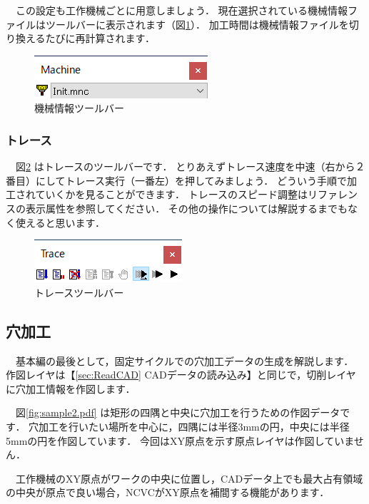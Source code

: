 \vspace*{2zh}
　この設定も工作機械ごとに用意しましょう．
現在選択されている機械情報ファイルはツールバーに表示されます（図\ref{fig:select.png}）．
加工時間は機械情報ファイルを切り換えるたびに再計算されます．

\begin{figure}[H]
\centering
\includegraphics{No2/fig/select.png}
\caption{機械情報ツールバー}
\label{fig:select.png}
\end{figure}

\subsubsection{トレース}

　図\ref{fig:trace.png} はトレースのツールバーです．
とりあえずトレース速度を中速（右から２番目）にしてトレース実行（一番左）を押してみましょう．
どういう手順で加工されていくかを見ることができます．
トレースのスピード調整はリファレンスの表示属性を参照してください．
その他の操作については解説するまでもなく使えると思います．

\begin{figure}[H]
\centering
\includegraphics{No2/fig/trace.png}
\caption{トレースツールバー}
\label{fig:trace.png}
\end{figure}

\subsection{穴加工}
\label{sec:hole}

　基本編の最後として，固定サイクルでの穴加工データの生成を解説します．
作図レイヤは【\ref{sec:ReadCAD} CADデータの読み込み】と同じで，切削レイヤに穴加工情報を作図します．

　図\ref{fig:sample2.pdf} は矩形の四隅と中央に穴加工を行うための作図データです．
穴加工を行いたい場所を中心に，四隅には半径3mmの円，中央には半径5mmの円を作図しています．
今回はXY原点を示す原点レイヤは作図していません．

　工作機械のXY原点がワークの中央に位置し，CADデータ上でも最大占有領域の中央が原点で良い場合，NCVCがXY原点を補間する機能があります．

